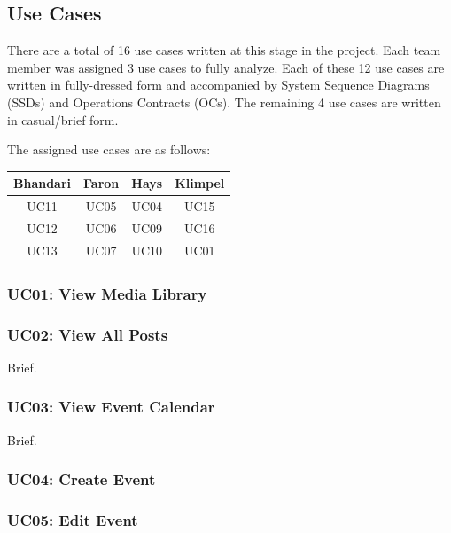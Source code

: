 \documentclass{article}
\begin{document}
\subsection{Use Cases}
There are a total of 16 use cases written at this stage in the project. Each team member was assigned 3 use cases to fully analyze. Each of these 12 use cases are written in fully-dressed form and accompanied by System Sequence Diagrams (SSDs) and Operations Contracts (OCs). The remaining 4 use cases are written in casual/brief form.

The assigned use cases are as follows:

\begin{center}
    \begin{tabular}{ | c | c | c | c | }
        \hline
        Bhandari & Faron & Hays & Klimpel \\
        \hline
        UC11     & UC05  & UC04 & UC15    \\
        \hline
        UC12     & UC06  & UC09 & UC16    \\
        \hline
        UC13     & UC07  & UC10 & UC01    \\
        \hline
    \end{tabular}
\end{center}
\subsubsection{UC01: View Media Library}

\subsubsection{UC02: View All Posts}
Brief.
\subsubsection{UC03: View Event Calendar}
Brief.
\subsubsection{UC04: Create Event}

\subsubsection{UC05: Edit Event}

\end{document}
